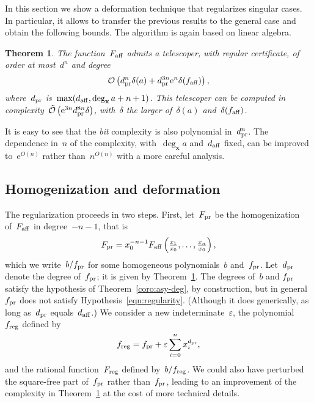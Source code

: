 \documentclass{sig-alternate}
\newtheorem{thm}{Theorem}
\newcommand{\softO}{\tilde{\mathcal{O}}}
\newcommand{\bigO}{{\mathcal{O}}}
\newcommand{\xx}{\mathbf{x}}
\newcommand{\pr}{{\smash{\mathrm{pr}}}}
\newcommand{\aff}{{\smash{\mathrm{aff}}}}
\newcommand{\reg}{{\smash{\mathrm{reg}}}}
\newcommand{\eexp}{\mathrm{e}}
\begin{document}
In this section we show a deformation technique that regularizes singular cases.
In particular, it allows to transfer the previous results to the general case and obtain the following bounds.
The algorithm is again based on linear algebra.

\begin{thm}\label{thm:bound-affine}
  The function~$F_\aff$ admits a telescoper, with regular certificate, of order at most~$d^n$ and degree
  \[ \bigO\left( d_\pr^n \delta(a) + d_\pr^{3n}\eexp^n \delta(f_\aff) \right), \]
  where~$d_\pr$ is~$\max(d_\aff,\deg_{\xx}a + n + 1)$.
  This telescoper can be computed in complexity~$\softO\left(\eexp^{3n}d_\pr^{8n}\delta \right)$, with~$\delta$ the larger of~$\delta(a)$ and~$\delta(f_\aff)$.
\end{thm}
 It is easy to see that the \emph{bit} complexity is also polynomial in~$d_\pr^n$.
The dependence in~$n$ of the complexity, with~$\deg_\xx a$ and~$d_\aff$ fixed, can be improved to~$\eexp^{O(n)}$ rather than~$n^{O(n)}$ with a more careful analysis.

\subsection{Homogenization and deformation}

\noindent The regularization proceeds in two steps.
First, let~$F_\pr$ be the homogenization of~$F_\aff$ in degree~$-n-1$, that is
\[ F_\pr = {x_0^{-n-1}}F_\aff\left( \tfrac{x_1}{x_0},\dotsc,\tfrac{x_n}{x_0} \right), \]
which we write~$b/f_\pr$ for some homogeneous polynomials~$b$ and~$f_\pr$. Let~$d_\pr$ denote the degree of~$f_\pr$;
it is given by Theorem~\ref{thm:bound-affine}.
The degrees of~$b$ and $f_\pr$ satisfy the hypothesis of Theorem~\ref{coro:asy-deg}, by construction, but in general~$f_\pr$ does not satisfy Hypothesis~\eqref{eqn:regularity}.
(Although it does generically, as long as~$d_\pr$ equals~$d_\aff$.)
We consider a new indeterminate~$\varepsilon$, the polynomial~$f_\reg$ defined by
\[ f_\reg = f_\pr + \varepsilon\sum_{i=0}^{\smash{n}} x_i^{d_\pr}, \]
and the rational function~$F_\reg$ defined by~$b/f_\reg$.
We could also have perturbed the square-free part of~$f_\pr$ rather than~$f_\pr$, leading to an improvement of the complexity in Theorem~\ref{thm:bound-affine} at the cost of more technical details.
\end{document}
